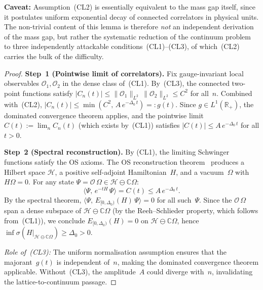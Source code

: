 \documentclass[12pt,a4paper]{article}
\theoremstyle{definition}
\theoremstyle{plain}
\theoremstyle{remark}
\begin{document}
\textbf{Caveat:} Assumption~(CL2) is essentially equivalent to the mass gap itself, since it postulates uniform exponential decay of connected correlators in physical units. The non-trivial content of this lemma is therefore \emph{not} an independent derivation of the mass gap, but rather the systematic reduction of the continuum problem to three independently attackable conditions~(CL1)--(CL3), of which~(CL2) carries the bulk of the difficulty.

\begin{proof}
\textbf{Step~1 (Pointwise limit of correlators).}
Fix gauge-invariant local observables $\mathcal{O}_1, \mathcal{O}_2$ in the
dense class of~(CL1). By~(CL3), the connected two-point functions satisfy
$|C_n(t)| \leq \|\mathcal{O}_1\|_{L^2}\,\|\mathcal{O}_2\|_{L^2} \leq C^2$
for all~$n$. Combined with~(CL2), $|C_n(t)| \leq \min(C^2,\,A\,e^{-\Delta_0\,t})
=: g(t)$. Since $g \in L^1(\mathbb{R}_+)$, the dominated convergence theorem
applies, and the pointwise limit $C(t) := \lim_n C_n(t)$ (which exists
by~(CL1)) satisfies $|C(t)| \leq A\,e^{-\Delta_0\,t}$ for all $t > 0$.

\textbf{Step~2 (Spectral reconstruction).}
By (CL1), the limiting Schwinger functions satisfy the OS axioms. The
OS reconstruction theorem~\cite{OsterwalderSchrader1973} produces a
Hilbert space $\mathcal{H}$, a positive self-adjoint Hamiltonian~$H$,
and a vacuum~$\Omega$ with $H\Omega = 0$. For any state
$\Psi = \mathcal{O}\,\Omega \in \mathcal{H} \ominus \mathbb{C}\Omega$:
\[
    \langle \Psi,\,e^{-tH}\,\Psi \rangle = C(t) \leq A\,e^{-\Delta_0\,t}.
\]
By the spectral theorem, $\langle \Psi,\,E_{[0,\Delta_0)}(H)\,\Psi \rangle = 0$
for all such~$\Psi$. Since the $\mathcal{O}\,\Omega$ span a dense subspace
of $\mathcal{H} \ominus \mathbb{C}\Omega$ (by the Reeh--Schlieder property,
which follows from~(CL1)), we conclude $E_{[0,\Delta_0)}(H) = 0$ on
$\mathcal{H} \ominus \mathbb{C}\Omega$, hence $\inf\sigma(H|_{\mathcal{H}
\ominus \mathbb{C}\Omega}) \geq \Delta_0 > 0$.

\emph{Role of~\textup{(CL3)}:} The uniform normalisation assumption ensures that the
majorant~$g(t)$ is independent of~$n$, making the dominated convergence
theorem applicable.  Without~(CL3), the amplitude~$A$ could diverge with~$n$,
invalidating the lattice-to-continuum passage.
\end{proof}
\end{document}
